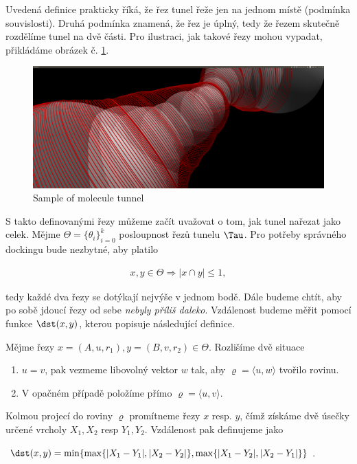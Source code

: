 Uvedená definice prakticky říká, že řez tunel řeže jen na jednom místě (podmínka souvislosti).
Druhá podmínka znamená, že řez je úplný, tedy že řezem skutečně rozdělíme tunel na dvě části.
Pro ilustraci, jak takové řezy mohou vypadat, přikládáme obrázek č. \ref{fig:tunnel_cuts}.
\begin{figure}[ht]
    \centering
    \includegraphics[width=\textwidth]{img/simple_cuts.png}
    \caption{Sample of molecule tunnel}
  \centering
  \label{fig:tunnel_cuts}
\end{figure}

S takto definovanými řezy můžeme začít uvažovat o tom, jak tunel nařezat jako celek.
Mějme $ \Theta = \{\theta_i\}_{i=0}^{k}$ posloupnost řezů tunelu $ \Tau $. Pro potřeby správného
dockingu bude nezbytné, aby platilo

\begin{align}
x, y \in \Theta \Rightarrow |x \cap y| \leq 1,
\end{align}

tedy každé dva řezy se dotýkají nejvýše v jednom bodě. Dále budeme chtít, aby po sobě
jdoucí řezy od sebe \textit{nebyly příliš daleko}. Vzdálenost budeme měřit pomocí funkce
$ \dst(x, y) $, kterou popisuje následující definice.

\begin{defi}
Mějme řezy $ x = (A, u, r_1), y = (B, v, r_2) \in \Theta $. Rozlišíme dvě situace
    \begin{enumerate}[label={(\arabic*)}]
        \item $ u = v $, pak vezmeme libovolný vektor $ w $ tak, aby
            $ \varrho = \langle u, w \rangle $ tvořilo rovinu.
        \item V opačném případě položíme přímo $ \varrho = \langle u, v \rangle $.
    \end{enumerate}
Kolmou projecí do roviny $ \varrho $ promítneme řezy $x $ resp. $y$, čímž získáme dvě úsečky
určené vrcholy $X_1, X_2 $ resp $Y_1, Y_2 $. Vzdálenost pak definujeme jako
    \begin{center}
        $ \dst(x, y) = \min\{ \max\{|X_1 - Y_1|, |X_2 - Y_2|\}, \max\{|X_1 - Y_2|, |X_2 - Y_1|\}\}$.
    \end{center}
\end{defi}


